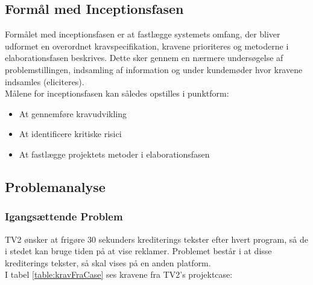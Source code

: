 \subsection{Formål med Inceptionsfasen}
Formålet med inceptionsfasen er at fastlægge systemets omfang, der bliver udformet en overordnet kravspecifikation, kravene prioriteres og metoderne i elaborationsfasen beskrives. Dette sker gennem en nærmere undersøgelse af problemstillingen, indsamling af information og under kundemøder hvor kravene indsamles (eliciteres).\\

\noindent
Målene for inceptionsfasen kan således opstilles i punktform:
\begin{itemize}
    \item At gennemføre kravudvikling
    \item At identificere kritiske risici
    \item At fastlægge projektets metoder i elaborationsfasen
\end{itemize}

\subsection{Problemanalyse}

\subsubsection{Igangsættende Problem}
TV2 ønsker at frigøre 30 sekunders krediterings tekster efter hvert program, så de i stedet kan bruge tiden på at vise reklamer. Problemet består i at disse krediterings tekster, så skal vises på en anden platform.\\

\noindent
I tabel \ref{table:kravFraCase} ses kravene fra TV2's projektcase:

